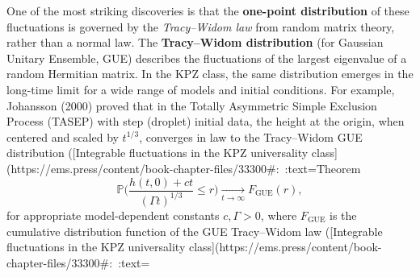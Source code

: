 \documentclass[letterpaper,11pt,oneside,reqno]{article}
\numberwithin{equation}{section}
\theoremstyle{definition}
\begin{document}
One of the most striking discoveries is that the \textbf{one-point distribution} of these fluctuations is governed by the \emph{Tracy–Widom law} from random matrix theory, rather than a normal law. The \textbf{Tracy–Widom distribution} (for Gaussian Unitary Ensemble, GUE) describes the fluctuations of the largest eigenvalue of a random Hermitian matrix. In the KPZ class, the same distribution emerges in the long-time limit for a wide range of models and initial conditions. For example, Johansson (2000) proved that in the Totally Asymmetric Simple Exclusion Process (TASEP) with step (droplet) initial data, the height at the origin, when centered and scaled by $t^{1/3}$, converges in law to the Tracy–Widom GUE distribution ([Integrable fluctuations in the KPZ universality class](https://ems.press/content/book-chapter-files/33300#:~:text=Theorem%
\[ \mathbb{P}\!\Big( \frac{h(t,0)+ct}{(\Gamma t)^{1/3}} \le r \Big) \xrightarrow[t\to\infty]{} F_{\mathrm{GUE}}(r), \]
for appropriate model-dependent constants $c,\Gamma>0$, where $F_{\mathrm{GUE}}$ is the cumulative distribution function of the GUE Tracy–Widom law ([Integrable fluctuations in the KPZ universality class](https://ems.press/content/book-chapter-files/33300#:~:text=%
\end{document}
